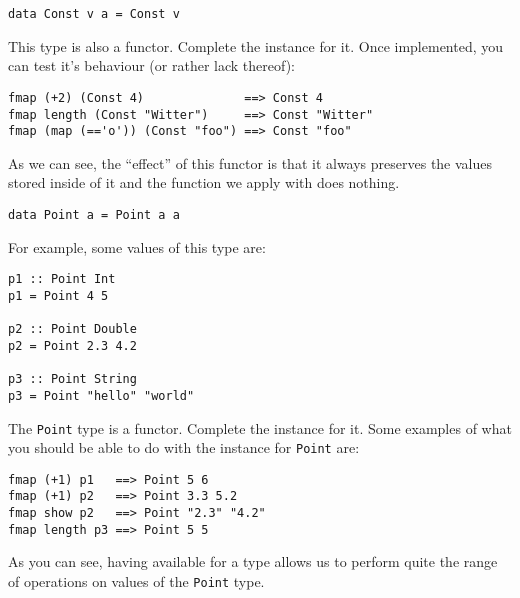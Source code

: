 \taskLine 

\begin{verbatim}
data Const v a = Const v
\end{verbatim}
This type is also a functor. Complete the  instance for it. Once implemented, you can test it's behaviour (or rather lack thereof):
\begin{verbatim}
fmap (+2) (Const 4)              ==> Const 4
fmap length (Const "Witter")     ==> Const "Witter"
fmap (map (=='o')) (Const "foo") ==> Const "foo"
\end{verbatim} 
As we can see, the ``effect'' of this functor is that it always preserves the values stored inside of it and the function we apply with  does nothing. 


\taskLine 

\begin{verbatim}
data Point a = Point a a
\end{verbatim}
For example, some values of this type are:
\begin{verbatim}
p1 :: Point Int
p1 = Point 4 5

p2 :: Point Double
p2 = Point 2.3 4.2 

p3 :: Point String
p3 = Point "hello" "world" 
\end{verbatim}
The \texttt{\small Point} type is a functor. Complete the  instance for it. Some examples of what you should be able to do with the  instance for \texttt{\small Point} are:
\begin{verbatim}
fmap (+1) p1   ==> Point 5 6 
fmap (+1) p2   ==> Point 3.3 5.2 
fmap show p2   ==> Point "2.3" "4.2"
fmap length p3 ==> Point 5 5
\end{verbatim}
As you can see, having  available for a type allows us to perform quite the range of operations on values of the \texttt{\small Point} type.


